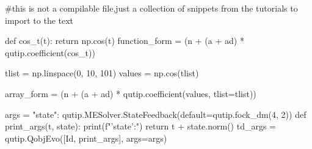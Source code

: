 #this is not a compilable file,just a collection of snippets from the tutorials to import to the text

def cos_t(t):
    return np.cos(t)
function_form = (n + (a + ad) * qutip.coefficient(cos_t))





tlist = np.linspace(0, 10, 101)
values = np.cos(tlist)

array_form = (n + (a + ad) * qutip.coefficient(values, tlist=tlist))



args = {"state": qutip.MESolver.StateFeedback(default=qutip.fock_dm(4, 2))}
def print_args(t, state):
    print(f"'state':")
    return t + state.norm()
td_args = qutip.QobjEvo([Id, print_args], args=args)
